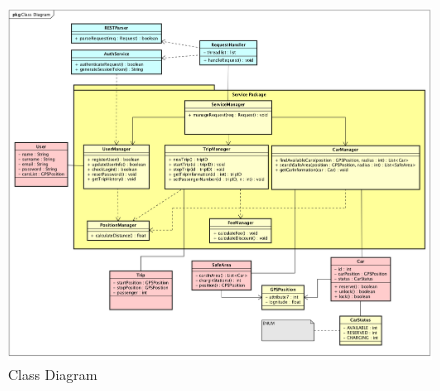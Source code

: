 \begin{figure}[H]	
	\centering
	\includegraphics[width=\textwidth]{img/class_diagram}
	\caption{Class Diagram}
\end{figure}

